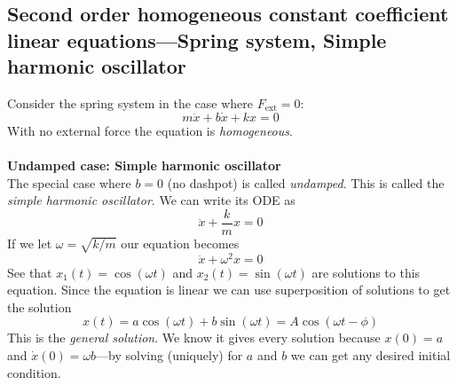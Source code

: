 \documentclass{report}
\begin{document}
\subsection{Second order homogeneous constant coefficient\\linear equations---Spring system, 
Simple harmonic oscillator}
Consider the spring system in the case where $F_\text{ext}=0$:
\begin{equation*}
m\ddot{x}+b\dot{x}+kx=0
\end{equation*}
With no external force the equation is \textit{homogeneous}.\\
\vspace{1mm}\\
\textbf{Undamped case: Simple harmonic oscillator}\\
The special case where $b=0$ (no dashpot) is called \textit{undamped}. This is called the \textit{simple harmonic
oscillator}.  We can write its ODE as
\begin{equation*}
\ddot{x}+\frac{k}{m}x=0
\end{equation*}
If we let $\omega=\sqrt{k/m}$ our equation becomes
\begin{equation*}
\ddot{x}+\omega^2x=0
\end{equation*}
See that $x_1(t)=\cos(\omega t)$ and $x_2(t)=\sin(\omega t)$ are solutions to this equation. Since the equation is
linear we can use superposition of solutions to get
the solution
\begin{equation*}
x(t)=a\cos(\omega t)+b\sin(\omega t)=A\cos(\omega t-\phi)
\end{equation*}
This is the \textit{general solution}. We know it gives every solution because
$x(0)=a$ and $\dot{x}(0)=\omega b$---by solving (uniquely) for $a$ and $b$ we can get any desired initial condition.
\newpage
\end{document}
